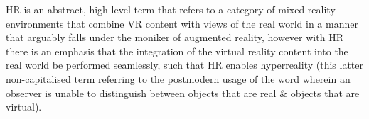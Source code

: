 HR is an abstract, high level term that refers to a category of mixed reality environments that combine VR content with views of the real world in a manner that arguably falls under the moniker of augmented reality, however with HR there is an emphasis that the integration of the virtual reality content into the real world be performed seamlessly, such that HR enables hyperreality (this latter non-capitalised term referring to the postmodern usage of the word wherein an observer is unable to distinguish between objects that are real \& objects that are virtual).










